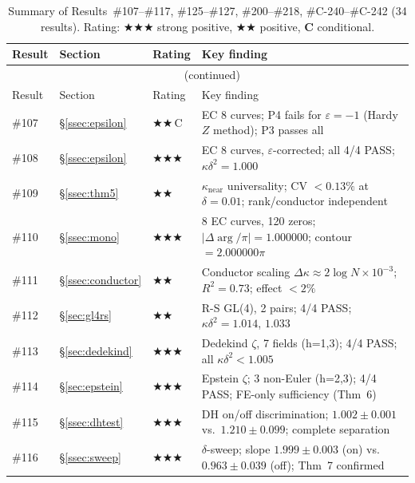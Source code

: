 \documentclass[11pt, a4paper]{article}
\theoremstyle{plain}
\theoremstyle{definition}
\begin{document}
\begin{longtable}{lllp{5.5cm}}
\caption{Summary of Results~\#107--\#117, \#125--\#127, \#200--\#218, \#C-240--\#C-242 (34 results). Rating: \textbf{$\bigstar\bigstar\bigstar$} strong
  positive, \textbf{$\bigstar\bigstar$} positive, \textbf{C} conditional.}
\label{tab:summary}\\
\toprule
Result & Section & Rating & Key finding \\
\midrule
\endfirsthead
\multicolumn{4}{c}{\tablename~\thetable{} (continued)}\\
\toprule
Result & Section & Rating & Key finding \\
\midrule
\endhead
\bottomrule
\endfoot
\#107 & \S\ref{ssec:epsilon}      & \textbf{$\bigstar\bigstar$}\,C  & EC 8 curves; P4 fails for $\varepsilon=-1$ (Hardy $Z$ method); P3 passes all \\
\#108 & \S\ref{ssec:epsilon}      & \textbf{$\bigstar\bigstar\bigstar$}    & EC 8 curves, $\varepsilon$-corrected; all 4/4 PASS; $\kappa\delta^{2}=1.000$ \\
\#109 & \S\ref{ssec:thm5}         & \textbf{$\bigstar\bigstar$}     & $\kappa_{\text{near}}$ universality; CV $<0.13\%$ at $\delta=0.01$; rank/conductor independent \\
\#110 & \S\ref{ssec:mono}         & \textbf{$\bigstar\bigstar\bigstar$}    & 8 EC curves, 120 zeros; $|\Delta\!\arg/\pi|=1.000000$; contour $=2.000000\pi$ \\
\#111 & \S\ref{ssec:conductor}    & \textbf{$\bigstar\bigstar$}     & Conductor scaling $\Delta\kappa\approx 2\log N\times 10^{-3}$; $R^{2}=0.73$; effect $<2\%$ \\
\#112 & \S\ref{sec:gl4rs}         & \textbf{$\bigstar\bigstar$}     & R-S GL(4), 2 pairs; 4/4 PASS; $\kappa\delta^{2}=1.014$, $1.033$ \\
\#113 & \S\ref{sec:dedekind}      & \textbf{$\bigstar\bigstar\bigstar$}    & Dedekind $\zeta$, 7 fields (h=1,3); 4/4 PASS; all $\kappa\delta^{2}<1.005$ \\
\#114 & \S\ref{sec:epstein}       & \textbf{$\bigstar\bigstar\bigstar$}    & Epstein $\zeta$; 3 non-Euler (h=2,3); 4/4 PASS; FE-only sufficiency (Thm~6) \\
\#115 & \S\ref{ssec:dhtest}       & \textbf{$\bigstar\bigstar\bigstar$}    & DH on/off discrimination; $1.002\pm0.001$ vs.\ $1.210\pm0.099$; complete separation \\
\#116 & \S\ref{ssec:sweep}        & \textbf{$\bigstar\bigstar\bigstar$}    & $\delta$-sweep; slope $1.999\pm0.003$ (on) vs.\ $0.963\pm0.039$ (off); Thm~7 confirmed \\

\end{longtable}
\end{document}
